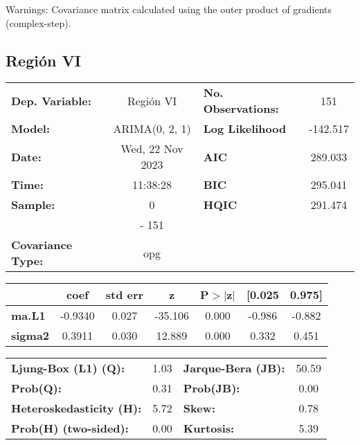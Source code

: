 \documentclass{article}%
\begin{document}
Warnings: \newline
 [1] Covariance matrix calculated using the outer product of gradients (complex-step).%
\subsection*{Región VI}%
\begin{center}
\begin{tabular}{lclc}
\toprule
\textbf{Dep. Variable:}          &    Región VI     & \textbf{  No. Observations:  } &    151      \\
\textbf{Model:}                  &  ARIMA(0, 2, 1)  & \textbf{  Log Likelihood     } &  -142.517   \\
\textbf{Date:}                   & Wed, 22 Nov 2023 & \textbf{  AIC                } &  289.033    \\
\textbf{Time:}                   &     11:38:28     & \textbf{  BIC                } &  295.041    \\
\textbf{Sample:}                 &        0         & \textbf{  HQIC               } &  291.474    \\
\textbf{}                        &       - 151      & \textbf{                     } &             \\
\textbf{Covariance Type:}        &       opg        & \textbf{                     } &             \\
\bottomrule
\end{tabular}
\begin{tabular}{lcccccc}
                & \textbf{coef} & \textbf{std err} & \textbf{z} & \textbf{P$> |$z$|$} & \textbf{[0.025} & \textbf{0.975]}  \\
\midrule
\textbf{ma.L1}  &      -0.9340  &        0.027     &   -35.106  &         0.000        &       -0.986    &       -0.882     \\
\textbf{sigma2} &       0.3911  &        0.030     &    12.889  &         0.000        &        0.332    &        0.451     \\
\bottomrule
\end{tabular}
\begin{tabular}{lclc}
\textbf{Ljung-Box (L1) (Q):}     & 1.03 & \textbf{  Jarque-Bera (JB):  } & 50.59  \\
\textbf{Prob(Q):}                & 0.31 & \textbf{  Prob(JB):          } &  0.00  \\
\textbf{Heteroskedasticity (H):} & 5.72 & \textbf{  Skew:              } &  0.78  \\
\textbf{Prob(H) (two-sided):}    & 0.00 & \textbf{  Kurtosis:          } &  5.39  \\
\bottomrule
\end{tabular}
\end{center}
\end{document}
